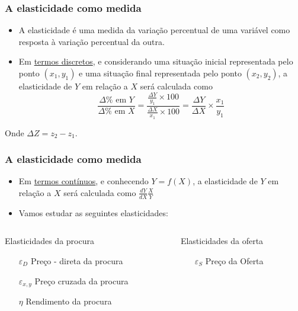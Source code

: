 \begin{frame}
	\frametitle{A elasticidade como medida}
	\begin{itemize}
		\item A elasticidade \'e uma medida da varia\c c\~ao percentual de uma vari\'avel como resposta \`a varia\c c\~ao percentual da outra.
		\item Em \underline{termos discretos}, e considerando uma situa\c c\~ao inicial representada pelo ponto $(x_1,y_1)$ e uma situa\c c\~ao final representada pelo ponto $(x_2,y_2)$, a elasticidade de $Y$ em rela\c c\~ao a $X$ ser\'a calculada como \[\frac{\Delta\% \text{ em } Y}{\Delta\% \text{ em } X}=\frac{\frac{\Delta Y}{y_1}\times 100}{\frac{\Delta X}{x_1}\times 100}=\frac{\Delta Y}{\Delta X}\times\frac{x_1}{y_1}\]
	\end{itemize} 

	Onde $\Delta Z = z_2-z_1$.

\end{frame}

\begin{frame}
	\frametitle{A elasticidade como medida}
	\begin{itemize}
		\item Em \underline{termos cont\'inuos}, e conhecendo $Y=f(X)$, a elasticidade de $Y$ em rela\c c\~ao a $X$ ser\'a calculada como \(\frac{d Y}{d X} \frac{X}{Y}\)
		\item Vamos estudar as seguintes elasticidades:
	\end{itemize}
	\vspace{0.2cm}
	\begin{columns}
		\begin{column}{0.50\textwidth}
			{\color{blue} Elasticidades da procura}
			\begin{itemize}
				\item[$\varepsilon_{D}$] Pre\c co - direta da procura
				\item[$\varepsilon_{x,y}$] Pre\c co cruzada da procura
				\item[$\eta$] Rendimento da procura
			\end{itemize}
		\end{column}
		\begin{column}{0.47\textwidth}
			{\color{blue} Elasticidades da oferta}
			\begin{itemize}
				\item[$\varepsilon_{S}$] Pre\c co da Oferta
			\end{itemize}
			\vspace{1cm}
		\end{column}
	\end{columns}
\end{frame}

